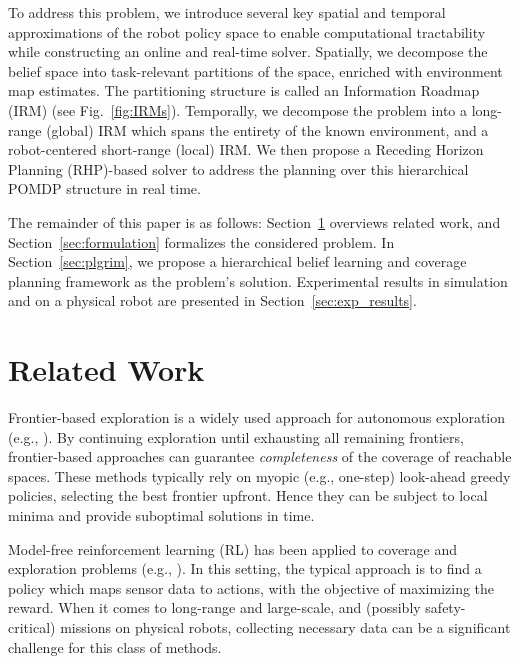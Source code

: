 \documentclass[letterpaper]{article} %
\newcommand{\phdone}[1]{} %
\begin{document}
\phdone{Contributions}
To address this problem, we introduce several key spatial and temporal approximations of the robot policy space to enable computational tractability while constructing an online and real-time solver.
Spatially, we decompose the belief space into task-relevant partitions of the space,
enriched with environment map estimates. %
The partitioning structure is called an Information Roadmap (IRM) (see Fig.~\ref{fig:IRMs}). Temporally, we decompose the problem into a long-range (global) IRM which spans the entirety of the known environment, and a robot-centered short-range (local) IRM. %
We then propose a Receding Horizon Planning (RHP)-based solver to address the planning over this hierarchical POMDP structure %
in real time.

\phdone{Outline}
The remainder of this paper is as follows: Section~\ref{sec:related_work} overviews related work, and Section~\ref{sec:formulation} formalizes the considered problem. In Section~\ref{sec:plgrim}, we propose a hierarchical belief learning and coverage planning framework as the problem's solution. Experimental results in simulation and on a physical robot are presented in Section~\ref{sec:exp_results}.%


\section{Related Work}\label{sec:related_work}
\phdone{Coverage--Frontier-based exploration}
Frontier-based exploration is a widely used approach for autonomous exploration (e.g., \cite{yamauchi1997frontier,tao2007motion,keidar2012robot,heng2015efficient,gonzalez2002navigation,grabowski2003autonomous}). By continuing exploration until exhausting all remaining frontiers, frontier-based approaches can guarantee \textit{completeness} of the coverage of reachable spaces.  These methods typically rely on myopic (e.g., one-step) look-ahead greedy policies, selecting the best frontier upfront. Hence they can be subject to local minima and provide suboptimal solutions in time.

\phdone{Coverage--(Model-free) RL-based approaches}
Model-free reinforcement learning (RL) has been applied to coverage and exploration problems (e.g., \cite{pathak_icm, rnd,burda2018study,ECR2018}). In this setting, the typical approach is to find a policy which maps sensor data to actions, with the objective of maximizing the reward. When it comes to long-range and large-scale, and (possibly safety-critical) missions on physical robots, collecting necessary data can be a significant challenge for this class of methods.
\end{document}
